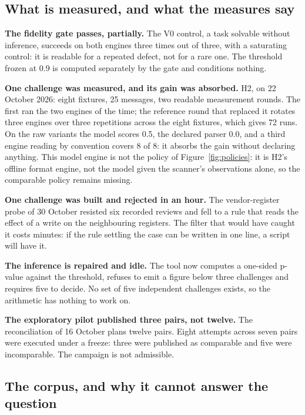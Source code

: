 \subsection{What is measured, and what the measures say}

\textbf{The fidelity gate passes, partially.} The V0 control, a task solvable
without inference, succeeds on both engines three times out of three, with a
saturating control: it is readable for a repeated defect, not for a rare one. The
threshold frozen at 0.9 is computed separately by the gate and conditions nothing.

\textbf{One challenge was measured, and its gain was absorbed.} H2, on 22 October
2026: eight fixtures, 25 messages, two readable measurement rounds. The first ran
the two engines of the time; the reference round that replaced it rotates three
engines over three repetitions across the eight fixtures, which gives 72 runs. On
the raw variants the model scores 0.5, the declared parser 0.0, and a third engine
reading by convention covers 8 of 8: it absorbs the gain without declaring anything.
This model engine is not the  policy of
Figure~\ref{fig:policies}: it is H2's offline format engine, not the model given
the scanner's observations alone, so the comparable policy remains missing.

\textbf{One challenge was built and rejected in an hour.} The vendor-register probe
of 30 October resisted six recorded reviews and fell to a rule that reads the
effect of a write on the neighbouring registers. The filter that would have
caught it costs minutes: if the rule settling the case can be written in one
line, a script will have it.

\textbf{The inference is repaired and idle.} The tool now computes a one-sided
p-value against the threshold, refuses to emit a figure below three challenges and
requires five to decide. No set of five independent challenges exists, so the
arithmetic has nothing to work on.

\textbf{The exploratory pilot published three pairs, not twelve.} The
reconciliation of 16 October plans twelve pairs. Eight attempts across seven pairs
were executed under a freeze: three were published as comparable and five were
incomparable. The campaign is not admissible.

\subsection{The corpus, and why it cannot answer the question}

